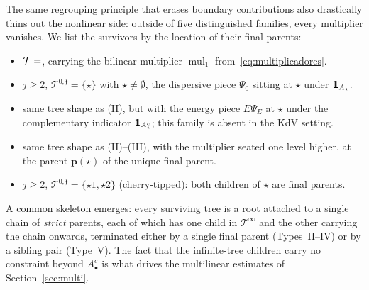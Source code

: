 \documentclass[a4paper,
11pt,  reqno]{amsart}
\makeatletter
\newcommand{\mathbbm}[1]{\mathchoice%
    {\hbox{\sffamily 1\kern-.40em 1}}%
    {\hbox{\sffamily 1\kern-.40em 1}}%
    {\hbox{\scriptsize\sffamily 1\kern-.30em 1}}%
    {\hbox{\tiny\sffamily 1\kern-.25em 1}}}%
\newcommand{\5}{\textup{V}}
\newcommand{\ind}{\mathbbm 1}
\theoremstyle{remark}
\newcommand{\bul}{\bullet}
\newcommand{\TT}{\mathcal{T}}
\newcommand{\pb}{\mathbf{p}}
\newcommand{\ff}{\mathfrak{f}}
\DeclareMathOperator{\mul}{mul}
\def\<#1>{\csname MH@symb@#1\endcsname}
\numberwithin{equation}{section}
\numberwithin{theorem}{section}
\makeatother
\begin{document}
The same regrouping principle that erases boundary contributions also drastically thins out the nonlinear side: outside of five distinguished families, every multiplier vanishes. We list the survivors by the location of their final parents:
\begin{itemize}
\item[\bf (I)] $\TT=\<1>$, carrying the bilinear multiplier $\mul_1$ from~\eqref{eq:multiplicadores}.
\item[\bf (II)] $j\ge 2$, $\TT^{0,\ff}=\{\star\}$ with $\star\neq \emptyset$, the dispersive piece $\Psi_0$ sitting at $\star$ under $\ind_{A_\star}$.
\item[\bf (III)] same tree shape as (II), but with the energy piece $E\Psi_E$ at $\star$ under the complementary indicator $\ind_{A_\star^c}$; this family is absent in the KdV setting.
\item[\bf (IV)] same tree shape as (II)--(III), with the multiplier seated one level higher, at the parent $\pb(\star)$ of the unique final parent.
\item[\bf (V)] $j\ge 2$, $\TT^{0,\ff}=\{\star1,\star2\}$ (cherry-tipped): both children of $\star$ are final parents.
\end{itemize}
A common skeleton emerges: every surviving tree is a root attached to a single chain of \emph{strict} parents, each of which has one child in $\TT^\infty$ and the other carrying the chain onwards, terminated either by a single final parent (Types~II--IV) or by a sibling pair (Type~V). The fact that the infinite-tree children carry no constraint beyond $A^c_\bul$ is what drives the multilinear estimates of Section~\ref{sec:multi}.
\end{document}
